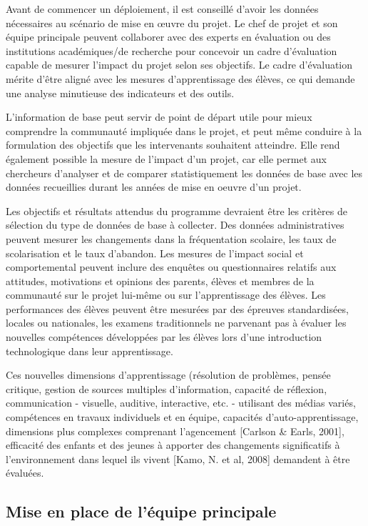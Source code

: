 \documentclass[12pt]{article}
\begin{document}
Avant de commencer un déploiement, il est conseillé d'avoir les données
nécessaires au scénario de mise en œuvre du projet. Le chef de projet et
son équipe principale peuvent collaborer avec des experts en évaluation ou des
institutions académiques/de recherche pour concevoir un cadre d'évaluation
capable de mesurer l'impact du projet selon ses objectifs. Le cadre
d’évaluation mérite d'être aligné avec les mesures d'apprentissage des
élèves, ce qui demande une analyse minutieuse des indicateurs et des
outils.

L'information de base peut servir de point de départ utile pour mieux
comprendre la communauté impliquée dans le projet, et peut même conduire à
la formulation des objectifs que les intervenants souhaitent
atteindre. Elle rend également possible la mesure de l'impact d'un projet, car
elle permet aux chercheurs d'analyser et de comparer statistiquement les
données de base avec les données recueillies durant les années de mise en
oeuvre d'un projet.

Les objectifs et résultats attendus du programme devraient être les
critères de sélection du type de données de base à collecter. Des données
administratives peuvent mesurer les changements dans la fréquentation
scolaire, les taux de scolarisation et le taux d’abandon. Les mesures de
l'impact social et comportemental peuvent inclure des enquêtes ou
questionnaires relatifs aux attitudes, motivations et opinions des parents,
élèves et membres de la communauté sur le projet lui-même ou sur
l'apprentissage des élèves. Les performances des élèves peuvent être
mesurées par des épreuves standardisées, locales ou nationales, les examens
traditionnels ne parvenant pas à évaluer les nouvelles compétences
développées par les élèves lors d'une introduction technologique dans leur
apprentissage.

Ces nouvelles dimensions d'apprentissage (résolution de problèmes, pensée
critique, gestion de sources multiples d'information, capacité de
réflexion, communication - visuelle, auditive, interactive, etc. -
utilisant des médias variés, compétences en travaux individuels et en
équipe,  capacités d'auto-apprentissage, dimensions plus complexes
comprenant l'agencement [Carlson \& Earls, 2001], efficacité des enfants et
des jeunes à apporter des changements significatifs à l'environnement dans
lequel ils vivent [Kamo, N. et al, 2008] demandent à être évaluées.
\subsection{Mise en place de l'équipe principale}
\label{sec-9-2}
\end{document}
